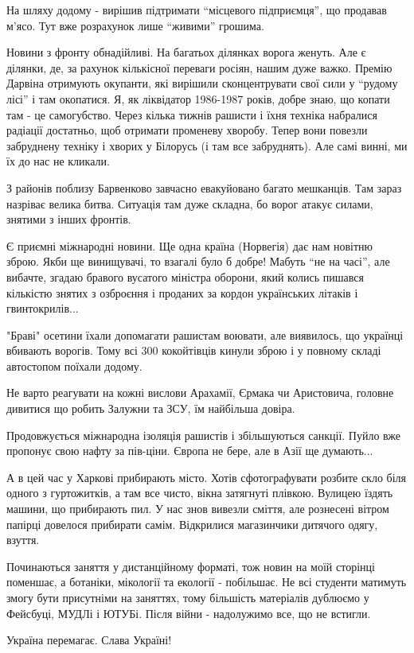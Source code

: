 На шляху додому - вирішив підтримати \enquote{місцевого підприємця}, що продавав м'ясо.
Тут вже розрахунок лише \enquote{живими} грошима.

Новини з фронту обнадійливі. На багатьох ділянках ворога женуть. Але є ділянки,
де, за рахунок кількісної переваги росіян, нашим дуже важко. Премію Дарвіна
отримують окупанти, які вирішили сконцентрувати свої сили у \enquote{рудому лісі} і там
окопатися. Я, як ліквідатор 1986-1987 років, добре знаю, що копати там - це
самогубство. Через кілька тижнів рашисти і їхня техніка набралися радіації
достатньо, щоб отримати променеву хворобу. Тепер вони повезли забруднену
техніку і хворих у Білорусь (і там все забруднять). Але  самі винні, ми їх до
нас не кликали.

З районів поблизу Барвенково завчасно евакуйовано багато мешканців. Там зараз
назріває велика битва. Ситуація там дуже складна, бо ворог атакує силами,
знятими з інших фронтів.

Є приємні міжнародні новини. Ще одна країна (Норвегія) дає нам новітню зброю.
Якби ще винищувачі, то взагалі було б добре! Мабуть \enquote{не на часі}, але вибачте,
згадаю бравого вусатого міністра оборони, який колись пишався кількістю знятих
з озброєння і проданих за кордон українських літаків і гвинтокрилів...

"Браві" осетини їхали допомагати рашистам воювати, але виявилось, що українці
вбивають ворогів. Тому всі 300 кокойтівців кинули зброю і у повному складі
автостопом поїхали додому.

Не варто реагувати на кожні вислови Арахамії, Єрмака чи Аристовича, головне
дивитися що робить Залужни та ЗСУ, їм найбільша довіра.

Продовжується міжнародна ізоляція рашистів і збільшуються санкції. Пуйло вже
пропонує свою нафту за пів-ціни. Європа не бере, але в Азії ще думають...

А в цей час у Харкові прибирають місто. Хотів сфотографувати розбите скло біля
одного з гуртожитків, а там все чисто, вікна затягнуті плівкою. Вулицею їздять
машини, що прибирають пил. У нас знов вивезли сміття, але рознесені вітром
папірці довелося прибирати самім. Відкрилися магазинчики дитячого одягу,
взуття.

Починаються заняття у дистанційному форматі, тож новин на моїй сторінці
поменшає, а ботаніки, мікології та екології - побільшає. Не всі студенти
матимуть змогу бути присутніми на заняттях, тому більшість матеріалів дублюємо
у Фейсбуці, МУДЛі і ЮТУБі. Після війни - надолужимо все, що не встигли.

Україна перемагає. Слава Україні!
